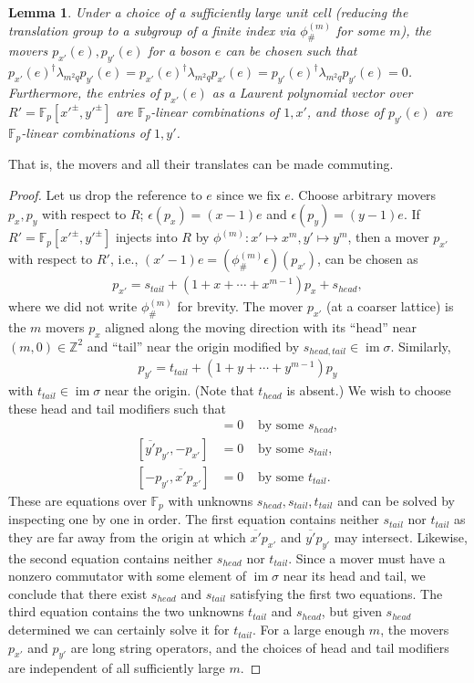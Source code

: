 \documentclass[aps,pra,
floatfix,notitlepage,
nofootinbib,
longbibliography,11pt]{revtex4-1}
\newtheorem{lemma}{Lemma}[section]
\theoremstyle{definition}
\newcommand{\ZZ}{{\mathbb{Z}}}
\newcommand{\FF}{{\mathbb{F}}}
\newcommand{\cg}[1]{{\phi_\#^{({#1})}}}
\DeclareMathOperator{\im}{\mathrm{im}}
\begin{document}
\begin{lemma}\label{lem:isotropy-commutingmover}
Under a choice of a sufficiently large unit cell
(reducing the translation group to a subgroup of a finite index via $\cg{m}$ for some $m$),
the movers $p_{x'}(e), p_{y'}(e)$ for a boson $e$ 
can be chosen such that 
$p_{x'}(e)^\dagger \lambda_{m^2q} p_{y'}(e) = p_{x'}(e)^\dagger \lambda_{m^2 q} p_{x'}(e) = p_{y'}(e)^\dagger \lambda_{m^2q} p_{y'}(e) = 0$.
Furthermore, the entries of $p_{x'}(e)$ as a Laurent polynomial vector over $R' = \FF_p[x'^\pm,y'^\pm]$
are $\FF_p$-linear combinations of $1,x'$,
and those of $p_{y'}(e)$ are $\FF_p$-linear combinations of $1,y'$.
\end{lemma}
That is, the movers and all their translates can be made commuting.
\begin{proof}
Let us drop the reference to $e$ since we fix $e$.
Choose arbitrary movers $p_x,p_y$ with respect to $R$; 
$\epsilon(p_x) = (x-1)e$ and $\epsilon(p_y) = (y-1)e$.
If $R' = \FF_p[x'^\pm, y'^\pm]$ injects into $R$ by $\phi^{(m)}: x' \mapsto x^m , y' \mapsto y^m$, then
a mover $p_{x'}$ with respect to $R'$, i.e., $(x'-1)e = (\cg{m}\epsilon)(p_{x'})$,
can be chosen as 
\begin{align}
p_{x'} = s_{tail}+(1+x+\cdots+x^{m-1})p_x + s_{head},
\end{align}
where we did not write $\cg{m}$ for brevity.
The mover $p_{x'}$ (at a coarser lattice) 
is the $m$ movers $p_x$ aligned along the moving direction 
with its ``head'' near $(m,0)\in \ZZ^2$ and ``tail'' near the origin modified
by $s_{head,tail} \in \im \sigma$.
Similarly, 
\begin{align}
p_{y'} = t_{tail} + (1+y+\cdots+y^{m-1})p_y 
\end{align}
with $t_{tail} \in \im \sigma$ near the origin.
(Note that $t_{head}$ is absent.)
We wish to choose these head and tail modifiers such that
\begin{align}
[\overline{x'}p_{x'}, \overline{y'} p_{y'}] &= 0 & \text{ by some } s_{head}, \nonumber \\
[\overline{y'} p_{y'}, - p_{x'}] &= 0 &\text{ by some } s_{tail},\label{eq:choices}\\
[-p_{y'},\overline{x'}p_{x'}] &= 0 &\text{ by some } t_{tail}. \nonumber
\end{align}
These are equations over $\FF_p$ with unknowns $s_{head}, s_{tail}, t_{tail}$ 
and can be solved by inspecting one by one in order.
The first equation contains neither $s_{tail}$ nor $t_{tail}$
as they are far away from the origin 
at which $\overline{x'} p_{x'}$ and $\overline{y'} p_{y'}$ may intersect.
Likewise, the second equation contains neither $s_{head}$ nor $t_{tail}$.
Since a mover must have a nonzero commutator 
with some element of $\im \sigma$ near its head and tail,
we conclude that there exist $s_{head}$ and $s_{tail}$ satisfying the first two equations.
The third equation contains the two unknowns $t_{tail}$ and $s_{head}$,
but given $s_{head}$ determined we can certainly solve it for $t_{tail}$.
For a large enough $m$, the movers $p_{x'}$ and $p_{y'}$ 
are long string operators, and the choices of head and tail modifiers 
are independent of all sufficiently large $m$.



\end{proof}
\end{document}
